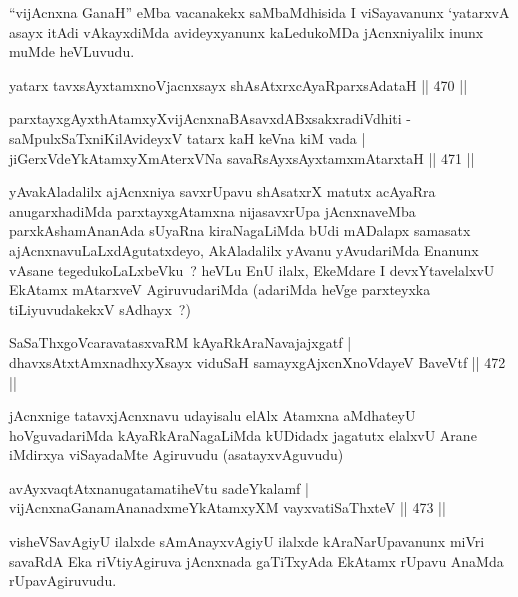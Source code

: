 \begin{artha}
``vijAcnxna GanaH'' eMba vacanakekx saMbaMdhisida I viSayavanunx
  `yatarxvA asayx itAdi vAkayxdiMda avideyxyanunx kaLedukoMDa
  jAcnxniyalilx inunx muMde heVLuvudu. 
\end{artha}


\begin{shl}
yatarx tavxsAyx\s \s tamxnoV\s jacnxsayx shAsAtxrxcAyaRparxsAdataH \hfill  || 470 ||
\end{shl}
\begin{shl}
parxtayxgAyxthAtamxyXvijAcnxnaBAsavxdABxsakxradiVdhiti -
saMpulxSaTxniKilAvideyxV tatarx kaH keVna kiM vada |
jiGerxVdeYkAtamxyXmAterxVNa savaRsAyxsAyx\s \s tamxmAtarxtaH \hfill  || 471 ||
\end{shl}

\begin{artha}
yAvakAladalilx ajAcnxniya savxrUpavu shAsatxrX matutx acAyaRra
anugarxhadiMda parxtayxgAtamxna nijasavxrUpa jAcnxnaveMba
parxkAshamAnanAda sUyaRna kiraNagaLiMda bUdi mADalapx samasatx
ajAcnxnavuLaLxdAgutatxdeyo, AkAladalilx yAvanu yAvudariMda Enanunx
vAsane tegedukoLaLxbeVku~? heVLu EnU ilalx, EkeMdare I devxYtavelalxvU
EkAtamx mAtarxveV AgiruvudariMda (adariMda heVge parxteyxka
tiLiyuvudakekxV sAdhayx~?)
\end{artha}

\begin{shl}
SaSaThxgoVcaravatasxvaRM kAyaRkAraNavajajxgatf |
dhavxsAtxtAmxnadhxyXsayx viduSaH samayxgAjxcnXnoVdayeV BaveVtf \hfill  || 472 ||
\end{shl}

\begin{artha}
jAcnxnige tatavxjAcnxnavu udayisalu elAlx Atamxna aMdhateyU
hoVguvadariMda kAyaRkAraNagaLiMda kUDidadx jagatutx elalxvU Arane
iMdirxya viSayadaMte Agiruvudu (asatayxvAguvudu)
\end{artha}

\begin{shl}
avAyxvaqtAtxnanugatamatiheVtu sadeYkalamf |
vijAcnxnaGanamAnanadxmeYkAtamxyXM vayxvatiSaThxteV \hfill  || 473 ||
\end{shl}

\begin{artha}
visheVSavAgiyU ilalxde sAmAnayxvAgiyU ilalxde kAraNarUpavanunx miVri savaRdA Eka riVtiyAgiruva jAcnxnada gaTiTxyAda EkAtamx rUpavu AnaMda rUpavAgiruvudu.
\end{artha}


